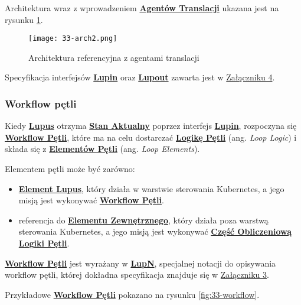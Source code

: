 Architektura wraz z wprowadzeniem \hyperlink{def:agent-translacji}{\textbf{Agentów Translacji}} ukazana jest na rysunku \ref{fig:33-arch2}.

\begin{figure}[!h]
    \centering \texttt{[image: 33-arch2.png]}
    \caption{Architektura referencyjna z agentami translacji}\label{fig:33-arch2}
\end{figure}

Specyfikacja interfejsów \hyperlink{def:interfejs-lupin}{\textbf{Lupin}} oraz \hyperlink{def:interfejs-lupout}{\textbf{Lupout}} zawarta jest w \hyperref[appendix:4]{Załączniku 4}.

\subsubsection{Workflow pętli}

Kiedy \hyperlink{def:lupus}{\textbf{Lupus}} otrzyma \hyperlink{def:stan-aktualny}{\textbf{Stan Aktualny}} poprzez interfejs \hyperlink{def:interfejs-lupin}{\textbf{Lupin}}, rozpoczyna się \hyperlink{def:workflow-petli}{\textbf{Workflow Pętli}}, które ma na celu dostarczać \hyperlink{def:logika-petli}{\textbf{Logikę Pętli}} (ang. \textit{Loop Logic}) i składa się z \hyperlink{def:element-petli}{\textbf{Elementów Pętli}} (ang. \textit{Loop Elements}). 

Elementem pętli może być zarówno:
\begin{itemize}
    \item \hyperlink{def:element-lupus}{\textbf{Element Lupus}}, który działa w warstwie sterowania Kubernetes, a jego misją jest wykonywać \hyperlink{def:workflow-petli}{\textbf{Workflow Pętli}}.
    \item referencja do \hyperlink{def:element-zewnetrzny}{\textbf{Elementu Zewnętrznego}}, który działa poza warstwą sterowania Kubernetes, a jego misją jest wykonywać \hyperlink{def:czesc-obliczeniowa}{\textbf{Część Obliczeniową}} \hyperlink{def:logika-petli}{\textbf{Logiki Pętli}}.
\end{itemize}

\hyperlink{def:workflow-petli}{\textbf{Workflow Pętli}} jest wyrażany w \hyperlink{def:lupn}{\textbf{LupN}}, specjalnej notacji do opisywania workflow pętli, której dokładna specyfikacja znajduje się w \hyperref[appendix:3]{Załączniku 3}.

Przykładowe \hyperlink{def:workflow-petli}{\textbf{Workflow Pętli}} pokazano na rysunku \ref{fig:33-workflow}.

